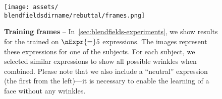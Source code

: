 \begin{figure}[t]
  \centering
  \texttt{[image: assets/\\blendfieldsdirname/rebuttal/frames.png]}
  \caption{\textbf{Training frames} -- In~\cref{sec:blendfields-experiments}, we show results for the \blendfields trained on $\nExpr{=}5$ expressions.
    The images represent these expressions for one of the subjects.
    For each subject, we selected similar expressions to show all possible
    wrinkles when combined.
    Please note that we also include a ``neutral'' expression (the first from
    the left)---it is necessary to enable the learning of a face without any
    wrinkles.
  }
  \label{fig:blendfields-supplementary-training-frames}
\end{figure}